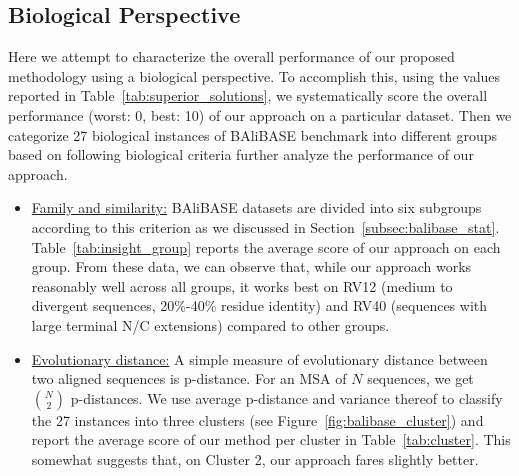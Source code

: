 \subsection{Biological Perspective}\label{sec:discussion}
Here we attempt to characterize the overall performance of our proposed methodology using a biological perspective. To accomplish this, using the values reported in Table~\ref{tab:superior_solutions}, we systematically score the overall performance (worst: 0, best: 10) of our approach on a particular dataset. Then we categorize 27 biological instances of BAliBASE benchmark into different groups based on following biological criteria further analyze the performance of our approach.
\begin{itemize}
	\item \underline{Family and similarity:} BAliBASE datasets are divided into six subgroups according to this criterion as we discussed in Section~\ref{subsec:balibase_stat}. Table~\ref{tab:insight_group} reports the average score of our approach on each group. From these data, we can observe that, while our approach works
	reasonably well across 
	all groups, it works best on RV12 (medium to divergent sequences, 20\%-40\% residue identity) and RV40 (sequences with large terminal N/C extensions) compared to other groups.
	
	\item \underline{Evolutionary distance:} A simple measure of evolutionary distance between two aligned sequences is p-distance. For an MSA of $N$ sequences, we get $N \choose 2$ p-distances. We use average p-distance and variance thereof to classify the 27 instances into three clusters (see Figure~\ref{fig:balibase_cluster}) and report the average score of our method per cluster in Table~\ref{tab:cluster}. This somewhat suggests that, on Cluster 2, our approach fares slightly better.
	
	
	
\end{itemize} 

